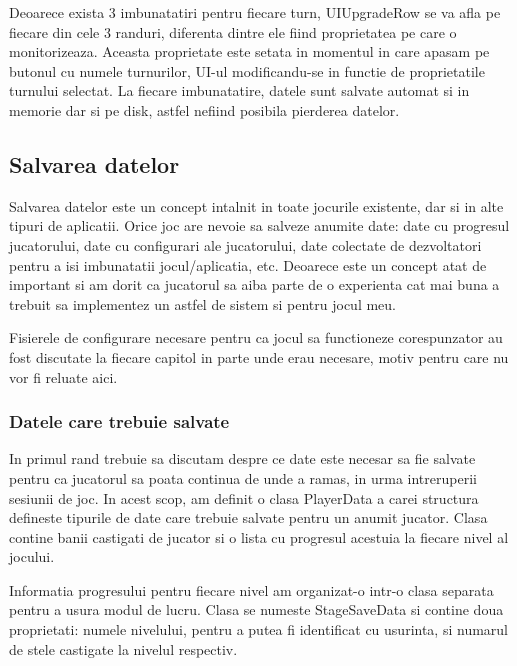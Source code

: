 \documentclass[12pt, a4paper]{article}
\begin{document}
	Deoarece exista 3 imbunatatiri pentru fiecare turn, UIUpgradeRow se va afla pe fiecare din cele 3 randuri, diferenta dintre ele fiind proprietatea pe care o monitorizeaza. Aceasta proprietate este setata in momentul in care apasam pe butonul cu numele turnurilor, UI-ul modificandu-se in functie de proprietatile turnului selectat. La fiecare imbunatatire, datele sunt salvate automat si in memorie dar si pe disk, astfel nefiind posibila pierderea datelor.
	
	
	
	
	
	\subsection{Salvarea datelor}
	
	Salvarea datelor este un concept intalnit in toate jocurile existente, dar si in alte tipuri de aplicatii. Orice joc are nevoie sa salveze anumite date: date cu progresul jucatorului, date cu configurari ale jucatorului, date colectate de dezvoltatori pentru a isi imbunatatii jocul/aplicatia, etc. Deoarece este un concept atat de important si am dorit ca jucatorul sa aiba parte de o experienta cat mai buna a trebuit sa implementez un astfel de sistem si pentru jocul meu.
	\newline
	
	Fisierele de configurare necesare pentru ca jocul sa functioneze corespunzator au fost discutate la fiecare capitol in parte unde erau necesare, motiv pentru care nu vor fi reluate aici.
	
	
	
	
	
	\subsubsection{Datele care trebuie salvate}
	
	In primul rand trebuie sa discutam despre ce date este necesar sa fie salvate pentru ca jucatorul sa poata continua de unde a ramas, in urma intreruperii sesiunii de joc. In acest scop, am definit o clasa PlayerData a carei structura defineste tipurile de date care trebuie salvate pentru un anumit jucator. Clasa contine banii castigati de jucator si o lista cu progresul acestuia la fiecare nivel al jocului. 
	\newline
	
	Informatia progresului pentru fiecare nivel am organizat-o intr-o clasa separata pentru a usura modul de lucru. Clasa se numeste StageSaveData si contine doua proprietati: numele nivelului, pentru a putea fi identificat cu usurinta, si numarul de stele castigate la nivelul respectiv.
	\newline
	
\end{document}
